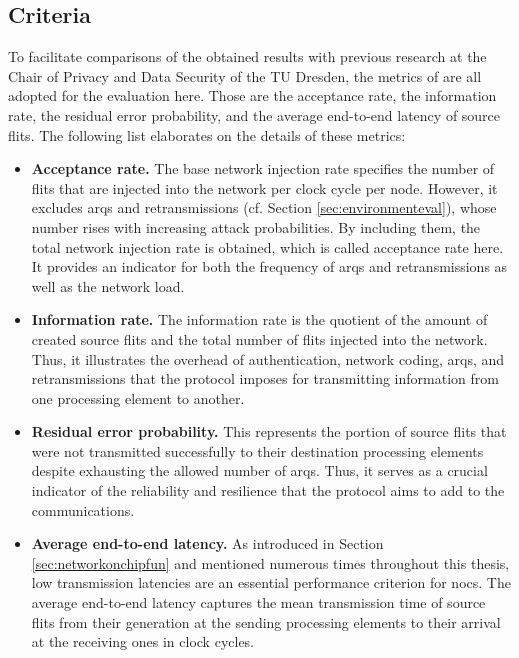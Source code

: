 \subsection{Criteria}\label{subsec:criteria}
To facilitate comparisons of the obtained results with previous research at the Chair of Privacy and Data Security of the TU Dresden, the metrics of
\citeauthor{moriam18activeattackers} \cites{moriam15manycorenc}{moriam18activeattackers} are all adopted for the evaluation here. Those are the
acceptance rate, the information rate, the residual error probability, and the average end-to-end latency of source flits. The following list
elaborates on the details of these metrics:
\begin{itemize}
    \item \textbf{Acceptance rate.} The base network injection rate specifies the number of flits that are injected into the network per clock cycle
        per node. However, it excludes \glspl{arq} and retransmissions (cf. Section \ref{sec:environmenteval}), whose number rises with increasing
        attack probabilities. By including them, the total network injection rate is obtained, which is called acceptance rate here. It provides an
        indicator for both the frequency of \glspl{arq} and retransmissions as well as the network load.
    \item \textbf{Information rate.} The information rate is the quotient of the amount of created source flits and the total number of flits injected
        into the network. Thus, it illustrates the overhead of authentication, network coding, \glspl{arq}, and retransmissions that the protocol
        imposes for transmitting information from one processing element to another.
    \item \textbf{Residual error probability.} This represents the portion of source flits that were not transmitted successfully to their destination
        processing elements despite exhausting the allowed number of \glspl{arq}. Thus, it serves as a crucial indicator of the reliability and
        resilience that the protocol aims to add to the communications.
    \item \textbf{Average end-to-end latency.} As introduced in Section \ref{sec:networkonchipfun} and mentioned numerous times throughout this
        thesis, low transmission latencies are an essential performance criterion for \glspl{noc}. The average end-to-end latency captures the mean
        transmission time of source flits from their generation at the sending processing elements to their arrival at the receiving ones in clock
        cycles.
\end{itemize}

